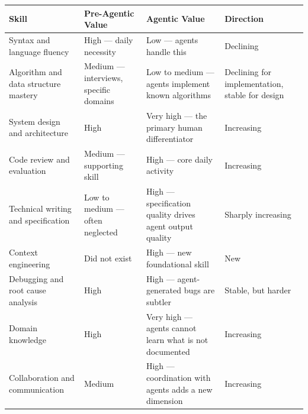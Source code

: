 \documentclass[
  a4paper,
  DIV=11,
  numbers=noendperiod]{scrreprt}
\newcounter{none} %
\begin{document}
{\def\LTcaptype{none} %
\begin{longtable}[]{@{}
  >{\raggedright\arraybackslash}p{}
  >{\raggedright\arraybackslash}p{}
  >{\raggedright\arraybackslash}p{}
  >{\raggedright\arraybackslash}p{}@{}}
\toprule\noalign{}
\begin{minipage}[b]{\linewidth}\raggedright
Skill
\end{minipage} & \begin{minipage}[b]{\linewidth}\raggedright
Pre-Agentic Value
\end{minipage} & \begin{minipage}[b]{\linewidth}\raggedright
Agentic Value
\end{minipage} & \begin{minipage}[b]{\linewidth}\raggedright
Direction
\end{minipage} \\
\midrule\noalign{}
\endhead
\bottomrule\noalign{}
\endlastfoot
Syntax and language fluency & High --- daily necessity & Low --- agents
handle this & Declining \\
Algorithm and data structure mastery & Medium --- interviews, specific
domains & Low to medium --- agents implement known algorithms &
Declining for implementation, stable for design \\
System design and architecture & High & Very high --- the primary human
differentiator & Increasing \\
Code review and evaluation & Medium --- supporting skill & High --- core
daily activity & Increasing \\
Technical writing and specification & Low to medium --- often neglected
& High --- specification quality drives agent output quality & Sharply
increasing \\
Context engineering & Did not exist & High --- new foundational skill &
New \\
Debugging and root cause analysis & High & High --- agent-generated bugs
are subtler & Stable, but harder \\
Domain knowledge & High & Very high --- agents cannot learn what is not
documented & Increasing \\
Collaboration and communication & Medium & High --- coordination with
agents adds a new dimension & Increasing \\
\end{longtable}
}
\end{document}

